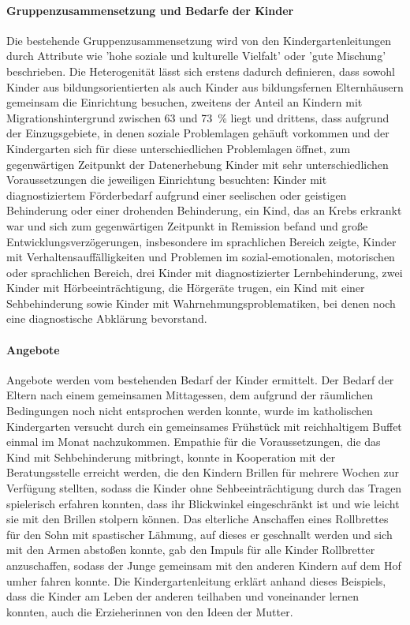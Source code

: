 \paragraph{Gruppenzusammensetzung und Bedarfe der Kinder}
Die bestehende Gruppenzusammensetzung wird von den Kindergartenleitungen durch Attribute wie 'hohe soziale und kulturelle Vielfalt' oder 'gute Mischung' beschrieben. Die Heterogenität lässt sich erstens dadurch definieren, dass sowohl Kinder aus bildungsorientierten als auch Kinder aus bildungsfernen Elternhäusern gemeinsam die Einrichtung besuchen, zweitens der Anteil an Kindern mit Migrationshintergrund zwischen 63 und 73 \,\% liegt und drittens, dass aufgrund der Einzugsgebiete, in denen soziale Problemlagen gehäuft vorkommen und der Kindergarten sich für diese unterschiedlichen Problemlagen öffnet, zum gegenwärtigen Zeitpunkt der Datenerhebung Kinder mit sehr unterschiedlichen Voraussetzungen die jeweiligen Einrichtung besuchten: 
Kinder mit diagnostiziertem Förderbedarf aufgrund einer seelischen oder geistigen Behinderung oder einer drohenden Behinderung, ein Kind, das an Krebs erkrankt war und sich zum gegenwärtigen Zeitpunkt in Remission befand und große Entwicklungsverzögerungen, insbesondere im sprachlichen Bereich zeigte, Kinder mit Verhaltensauffälligkeiten und Problemen im sozial-emotionalen, motorischen oder sprachlichen Bereich, drei Kinder mit diagnostizierter Lernbehinderung, zwei Kinder mit Hörbeeinträchtigung, die Hörgeräte trugen, ein Kind mit einer Sehbehinderung sowie Kinder mit Wahrnehmungsproblematiken, bei denen noch eine diagnostische Abklärung bevorstand.

\paragraph{Angebote}
Angebote werden vom bestehenden Bedarf der Kinder ermittelt.
Der Bedarf der Eltern nach einem gemeinsamen Mittagessen, dem aufgrund der räumlichen Bedingungen noch nicht entsprochen werden konnte, wurde im katholischen Kindergarten versucht durch ein gemeinsames Frühstück mit reichhaltigem Buffet einmal im Monat nachzukommen. Empathie für die Voraussetzungen, die das Kind mit Sehbehinderung mitbringt, konnte in Kooperation mit der Beratungsstelle erreicht werden, die den Kindern Brillen für mehrere Wochen zur Verfügung stellten, sodass die Kinder ohne Sehbeeinträchtigung durch das Tragen spielerisch erfahren konnten, dass ihr Blickwinkel eingeschränkt ist und wie leicht sie mit den Brillen stolpern können. 
Das elterliche Anschaffen eines Rollbrettes für den Sohn mit spastischer Lähmung, auf dieses er geschnallt werden und sich mit den Armen abstoßen konnte, gab den Impuls für alle Kinder Rollbretter anzuschaffen, sodass der Junge gemeinsam mit den anderen Kindern auf dem Hof umher fahren konnte. Die Kindergartenleitung erklärt anhand dieses Beispiels, dass die Kinder am Leben der anderen teilhaben und voneinander lernen konnten, auch die Erzieherinnen von den Ideen der Mutter. 

